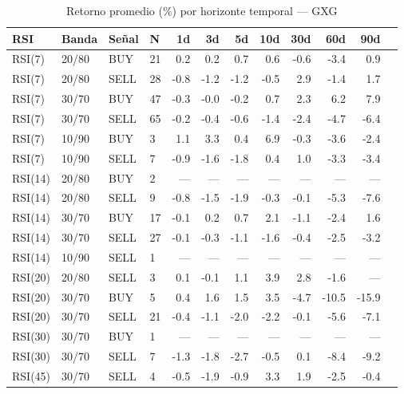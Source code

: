%
\begin{table}[htbp]
    \centering
    \caption{Retorno promedio (\%) por horizonte temporal --- GXG}
    \label{tab:media_gxg}
    \small
    \begin{tabular}{llllrrrrrrrr}
        \toprule
        \textbf{RSI} & \textbf{Banda} & \textbf{Se\~{n}al} & \textbf{N} & \textbf{1d} & \textbf{3d} & \textbf{5d} & \textbf{10d} & \textbf{30d} & \textbf{60d} & \textbf{90d} \\
        \midrule
        RSI(7) & 20/80 & BUY & 21 & 0.2 & 0.2 & 0.7 & 0.6 & -0.6 & -3.4 & 0.9 \\
        RSI(7) & 20/80 & SELL & 28 & -0.8 & -1.2 & -1.2 & -0.5 & 2.9 & -1.4 & 1.7 \\
        RSI(7) & 30/70 & BUY & 47 & -0.3 & -0.0 & -0.2 & 0.7 & 2.3 & 6.2 & 7.9 \\
        RSI(7) & 30/70 & SELL & 65 & -0.2 & -0.4 & -0.6 & -1.4 & -2.4 & -4.7 & -6.4 \\
        RSI(7) & 10/90 & BUY & 3 & 1.1 & 3.3 & 0.4 & 6.9 & -0.3 & -3.6 & -2.4 \\
        RSI(7) & 10/90 & SELL & 7 & -0.9 & -1.6 & -1.8 & 0.4 & 1.0 & -3.3 & -3.4 \\
        \midrule
        RSI(14) & 20/80 & BUY & 2 & --- & --- & --- & --- & --- & --- & --- \\
        RSI(14) & 20/80 & SELL & 9 & -0.8 & -1.5 & -1.9 & -0.3 & -0.1 & -5.3 & -7.6 \\
        RSI(14) & 30/70 & BUY & 17 & -0.1 & 0.2 & 0.7 & 2.1 & -1.1 & -2.4 & 1.6 \\
        RSI(14) & 30/70 & SELL & 27 & -0.1 & -0.3 & -1.1 & -1.6 & -0.4 & -2.5 & -3.2 \\
        RSI(14) & 10/90 & SELL & 1 & --- & --- & --- & --- & --- & --- & --- \\
        \midrule
        RSI(20) & 20/80 & SELL & 3 & 0.1 & -0.1 & 1.1 & 3.9 & 2.8 & -1.6 & --- \\
        RSI(20) & 30/70 & BUY & 5 & 0.4 & 1.6 & 1.5 & 3.5 & -4.7 & -10.5 & -15.9 \\
        RSI(20) & 30/70 & SELL & 21 & -0.4 & -1.1 & -2.0 & -2.2 & -0.1 & -5.6 & -7.1 \\
        \midrule
        RSI(30) & 30/70 & BUY & 1 & --- & --- & --- & --- & --- & --- & --- \\
        RSI(30) & 30/70 & SELL & 7 & -1.3 & -1.8 & -2.7 & -0.5 & 0.1 & -8.4 & -9.2 \\
        \midrule
        RSI(45) & 30/70 & SELL & 4 & -0.5 & -1.9 & -0.9 & 3.3 & 1.9 & -2.5 & -0.4 \\
        \bottomrule
    \end{tabular}
\end{table}
